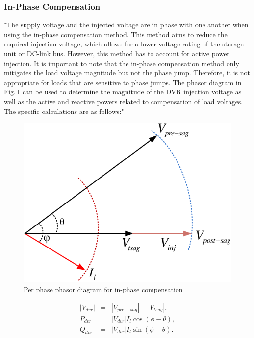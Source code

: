 \subsubsection{In-Phase Compensation}
"The supply voltage and the injected voltage are in phase with one another when using the in-phase compensation method. This method aims to reduce the required injection voltage, which allows for a lower voltage rating of the storage unit or DC-link bus. However, this method has to account for active power injection. It is important to note that the in-phase compensation method only mitigates the load voltage magnitude but not the phase jump. Therefore, it is not appropriate for loads that are sensitive to phase jumps. The phasor diagram in Fig.\,\ref{2.inphase_sag} can be used to determine the magnitude of the DVR injection voltage as well as the active and reactive powers related to compensation of load voltages. The specific calculations are as follows:"
\begin{figure}[h!]
	\centering
\includegraphics[scale=0.85]{figures/Chapter_1_2/c2_in_phase}
   \caption{Per phase phasor diagram for in-phase compensation \cite{ManikPradhan}}
   \label{2.inphase_sag}
\end{figure}
\begin{eqnarray}
\label{2.in_phase}
\left|V_{dvr}\right| &=& \left|V_{pre-sag}\right|-\left|V_{tsag}\right|,\\
 P_{dvr} &=& \left|V_{dvr}\right| I_{l}\cos(\phi-\theta),\\
 Q_{dvr} &=& \left|V_{dvr}\right| I_{l}\sin(\phi-\theta).
\end{eqnarray}

